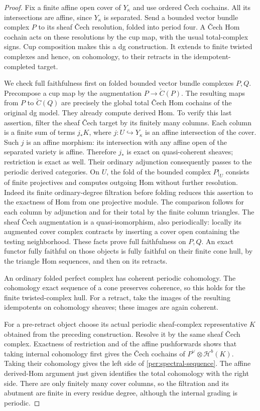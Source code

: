 \begin{proof}
Fix a finite affine open cover of $Y_\kappa$ and use ordered
\v Cech cochains.  All its intersections are affine, since
$Y_\kappa$ is separated.  Send a bounded vector bundle complex $P$
to its sheaf \v Cech resolution, folded into period four.  A
\v Cech Hom cochain acts on these resolutions by the cup map, with
the usual total-complex signs.  Cup composition makes this a dg
construction.  It extends to finite twisted complexes and hence,
on cohomology, to their retracts in the idempotent-completed target.

We check full faithfulness first on folded bounded vector bundle
complexes $P,Q$.  Precompose a cup map by the augmentation
$P\to\check C(P)$.  The resulting maps from $P$ to
$\check C(Q)$ are precisely the global total \v Cech Hom
cochains of the original dg model.  They already compute derived
Hom.  To verify this last assertion, filter the sheaf \v Cech target
by its finitely many columns.  Each column is a finite sum of
terms $j_*K$, where $j:U\hookrightarrow Y_\kappa$ is an affine
intersection of the cover.  Such $j$ is an affine morphism:
its intersection with any affine open of the separated variety is
affine.  Therefore $j_*$ is exact on quasi-coherent sheaves;
restriction is exact as well.  Their ordinary adjunction consequently
passes to the periodic derived categories.  On $U$, the fold of the
bounded complex $P|_U$ consists of finite projectives and computes
outgoing Hom without further resolution.  Indeed its finite
ordinary-degree filtration before folding reduces this assertion
to the exactness of Hom from one projective module.  The comparison follows
for each column by adjunction and for their total by the finite
column triangles.  The sheaf \v Cech augmentation is a
quasi-isomorphism, also periodically: locally its augmented cover
complex contracts by inserting a cover open containing the testing
neighborhood.  These facts prove full faithfulness on $P,Q$.
An exact functor fully faithful on those objects is fully faithful
on their finite cone hull, by the triangle Hom sequences, and then
on its retracts.

An ordinary folded perfect complex has coherent periodic cohomology.
The cohomology exact sequence of a cone preserves coherence, so this
holds for the finite twisted-complex hull.  For a retract, take the
images of the resulting idempotents on cohomology sheaves; these
images are again coherent.

For a pre-retract object choose its actual periodic sheaf-complex
representative $K$ obtained from the preceding construction.
Resolve it by the same sheaf \v Cech complex.  Exactness of
restriction and of the affine pushforwards shows that taking
internal cohomology first gives the \v Cech cochains of
$P^\vee\otimes\mathcal H^b(K)$.  Taking their cohomology gives
the left side of \eqref{per:spectral-sequence}.  The affine
derived-Hom argument just given identifies the total cohomology
with the right side.  There are only finitely many cover columns,
so the filtration and its abutment are finite in every residue
degree, although the internal grading is periodic.


\end{proof}

